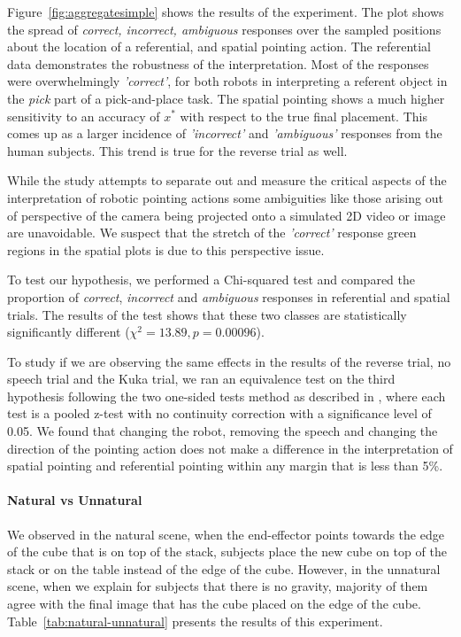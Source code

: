 Figure~\ref{fig:aggregatesimple} shows the results of the experiment. The plot shows the spread of \textit{correct, incorrect, ambiguous} responses over the sampled positions about the location of a referential, and spatial pointing action. The referential data demonstrates the robustness of the interpretation. Most of the responses were overwhelmingly \textit{'correct'}, for both robots in interpreting a referent object in the \textit{pick} part of a pick-and-place task. The spatial pointing shows a much higher sensitivity to an accuracy of $x^*$ with respect to the true final placement. This comes up as a larger incidence of \textit{'incorrect'} and \textit{'ambiguous'} responses from the human subjects. This trend is true for the reverse trial as well.

While the study attempts to separate out and measure the critical aspects of the interpretation of robotic pointing actions some ambiguities like those arising out of perspective of the camera being projected onto a simulated 2D video or image are unavoidable. We suspect that the stretch of the \textit{'correct'} response green regions in the spatial plots is due to this perspective issue.

To test our hypothesis, we performed a Chi-squared test and compared the proportion of \textit{correct}, \textit{incorrect} and \textit{ambiguous} responses in referential and spatial trials. The results of the test shows that these two classes are statistically significantly different ($\chi^2= 13.89, p = 0.00096$).

To study if we are observing the same effects in the results of the reverse trial, no speech trial and the Kuka trial, we ran an equivalence test on the third hypothesis following the two one-sided tests method as described in \cite{lakens2017equivalence}, where each test is a pooled z-test with no continuity
correction with a significance level of 0.05. We found that changing the robot, removing the speech and changing the direction of the pointing action does not make a difference in the interpretation of spatial pointing and referential pointing within any margin that is less than 5\%.


\paragraph{Natural vs Unnatural}

We observed in the natural scene, when the end-effector points towards the edge of the cube that is on top of the stack, subjects place the new cube on top of the stack or on the table instead of the edge of the cube. However, in the unnatural scene, when we explain for subjects that there is no gravity, majority of them agree with the final image that has the cube placed on the edge of the cube. Table~\ref{tab:natural-unnatural} presents the results of this experiment. 

